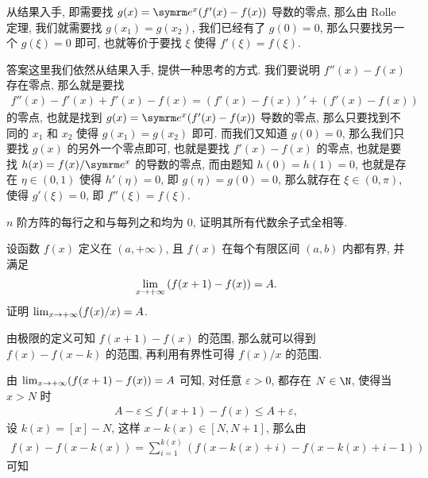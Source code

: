 \begin{exercise}[series=exer]
\begin{hint}
      从结果入手, 即需要找 $ g(x) = \me^{x}(f'(x) - f(x)) $ 导数的零点, 那么由 Rolle 定理, 我们就需要找 $ g(x_{1}) = g(x_{2}) $, 我们已经有了 $ g(0) = 0 $, 那么只要找另一个 $ g(\xi) = 0 $ 即可, 也就等价于要找 $ \xi $ 使得 $ f'(\xi) = f(\xi) $.
  \end{hint}
  \begin{answer}
      答案这里我们依然从结果入手, 提供一种思考的方式. 我们要说明 $ f''(x) - f(x) $ 存在零点, 那么就是要找
      \begin{align*}
          f''(x) - f'(x) + f'(x) - f(x) = (f'(x) - f(x))' + (f'(x) - f(x))
      \end{align*}
      的零点, 也就是找到 $ g(x) = \me^{x}(f'(x) - f(x)) $ 导数的零点, 那么只要找到不同的 $ x_{1} $ 和 $ x_{2} $ 使得 $ g(x_{1}) = g(x_{2}) $ 即可. 而我们又知道 $ g(0) = 0 $, 那么我们只要找 $ g(x) $ 的另外一个零点即可, 也就是要找 $ f'(x) - f(x) $ 的零点, 也就是要找 $ h(x) = f(x)/\me^{x} $ 的导数的零点, 而由题知 $ h(0) = h(1) = 0 $, 也就是存在 $ \eta\in(0, 1) $ 使得 $ h'(\eta) = 0 $, 即 $ g(\eta) = g(0) = 0 $, 那么就存在 $ \xi \in (0, \pi) $, 使得 $ g'(\xi) = 0 $, 即 $ f''(\xi) = f(\xi) $.
  \end{answer}
  \item $ n $ 阶方阵的每行之和与每列之和均为 0, 证明其所有代数余子式全相等.
  \item 设函数 $ f(x) $ 定义在 $ (a, +\infty) $, 且 $ f(x) $ 在每个有限区间 $ (a, b) $ 内都有界, 并满足
  \begin{align*}
      \lim_{x \to +\infty} \qty(f(x + 1) - f(x)) = A.
  \end{align*}
  证明 $ \lim_{x \to +\infty} (f(x) / x) = A $.
  \begin{hint}
      由极限的定义可知 $ f(x + 1) - f(x) $ 的范围, 那么就可以得到 $ f(x) - f(x - k) $ 的范围, 再利用有界性可得 $ f(x)/x $ 的范围.
  \end{hint}
  \begin{answer}
      由 $ \lim_{x \to +\infty} (f(x + 1) - f(x)) = A $ 可知, 对任意 $ \varepsilon > 0 $, 都存在 $ N \in \N $, 使得当 $ x > N $ 时
      \begin{align*}
          A - \varepsilon \le f(x + 1) - f(x) \le A + \varepsilon,
      \end{align*}
      设 $ k(x) = [x] - N $, 这样 $ x - k(x) \in [N, N + 1] $, 那么由
      \begin{align*}
          f(x) - f(x - k(x)) = \sum_{i = 1}^{k(x)}(f(x - k(x) + i) - f(x - k(x) + i - 1))
      \end{align*}
      可知
      \begin{align*}

\end{align*}
\end{answer}
\end{exercise}
